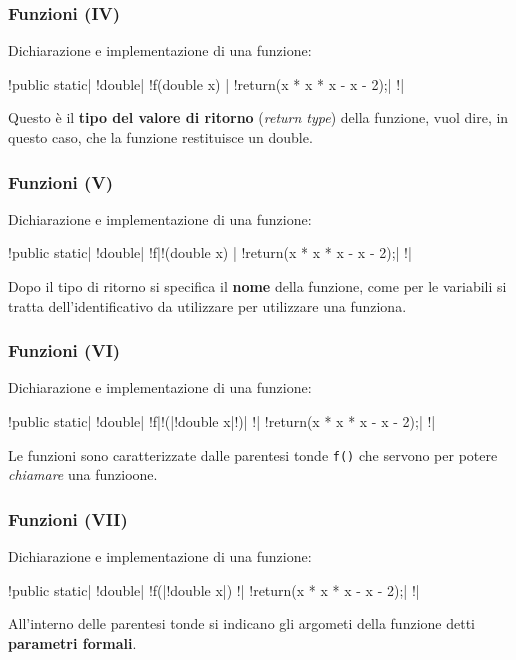 \begin{frame}[fragile]\frametitle{Funzioni (IV)}

  Dichiarazione e implementazione di una funzione:
  
  \begin{JavaCodePlain}[commandchars=\\!|]
  \Grey!public static| \Red!double| \Grey!f(double x) {|
      \Grey!return(x * x * x - x - 2);|
  \Grey!}|
  \end{JavaCodePlain}
  
  Questo è il \textbf{tipo del valore di ritorno} (\emph{return type})
  della funzione, vuol dire, in questo caso, che la funzione restituisce
  un double.

\end{frame}

\begin{frame}[fragile]\frametitle{Funzioni (V)}

  Dichiarazione e implementazione di una funzione:

  \begin{JavaCodePlain}[commandchars=\\!|]
  \Grey!public static| \Grey!double| \Red!f|\Grey!(double x) {|
      \Grey!return(x * x * x - x - 2);|
  \Grey!}|
  \end{JavaCodePlain}
  
  Dopo il tipo di ritorno si specifica il \textbf{nome} della funzione,
  come per le variabili si tratta dell'identificativo da utilizzare per
  utilizzare una funziona.

\end{frame}

\begin{frame}[fragile]\frametitle{Funzioni (VI)}

  Dichiarazione e implementazione di una funzione:

  \begin{JavaCodePlain}[commandchars=\\!|]
  \Grey!public static| \Grey!double| \Grey!f|\Red!(|\Grey!double x|\Red!)| \Grey!{|
      \Grey!return(x * x * x - x - 2);|
  \Grey!}|
  \end{JavaCodePlain}

  Le funzioni sono caratterizzate dalle parentesi tonde \texttt{f()} che servono
  per potere \emph{chiamare} una funzioone.

\end{frame}

\begin{frame}[fragile]\frametitle{Funzioni (VII)}

  Dichiarazione e implementazione di una funzione:

  \begin{JavaCodePlain}[commandchars=\\!|]
  \Grey!public static| \Grey!double| \Grey!f(|\Red!double x|) \Grey!{|
      \Grey!return(x * x * x - x - 2);|
  \Grey!}|
  \end{JavaCodePlain}

  All'interno delle parentesi tonde si indicano gli argometi della
  funzione detti \textbf{parametri formali}.

\end{frame}


